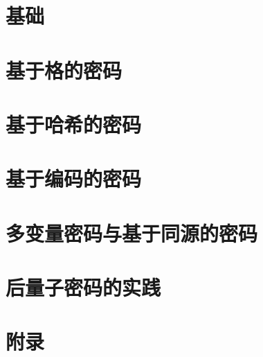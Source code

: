 \part{基础}
\part{基于格的密码}
\part{基于哈希的密码}
\part{基于编码的密码}
\part{多变量密码与基于同源的密码}
\part{后量子密码的实践}
\part*{附录}
